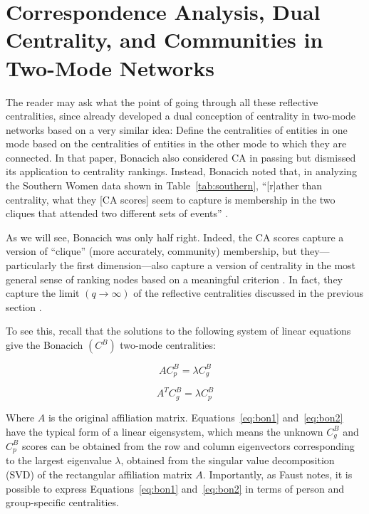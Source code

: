 \documentclass[a4paper,fleqn]{cas-sc}
\begin{document}
\section{Correspondence Analysis, Dual Centrality, and Communities in Two-Mode Networks} \label{sec:ca}
The reader may ask what the point of going through all these reflective centralities, since \citet{bonacich1991simultaneous} already developed a dual conception of centrality in two-mode networks based on a very similar idea: Define the centralities of entities in one mode based on the centralities of entities in the other mode to which they are connected. In that paper, Bonacich also considered CA in passing but dismissed its application to centrality rankings. Instead, Bonacich noted that, in analyzing the Southern Women data shown in Table~\ref{tab:southern}, ``[r]ather than centrality, what they [CA scores] seem to capture is membership in the two cliques that attended two different sets of events'' \citeyearpar[164]{bonacich1991simultaneous}. 

As we will see, Bonacich was only half right. Indeed, the CA scores capture a version of ``clique'' (more accurately, community) membership, but they---particularly the first dimension---also capture a version of centrality in the most general sense of ranking nodes based on a meaningful criterion \citep{borgatti2006graph}. In fact, they capture the limit $(q \rightarrow \infty)$ of the reflective centralities discussed in the previous section \citep{mealy2019interpreting}. 

To see this, recall that the solutions to the following system of linear equations give the Bonacich $(C^B)$ two-mode centralities:

\begin{equation}
    AC^B_p = \lambda C^B_g 
    \label{eq:bon1}
\end{equation}

\begin{equation}
    A^TC^B_g = \lambda C^B_p 
    \label{eq:bon2}
\end{equation}

Where $A$ is the original affiliation matrix. Equations~\ref{eq:bon1} and~\ref{eq:bon2} have the typical form of a linear eigensystem, which means the unknown $C^B_g$ and $C^B_p$ scores can be obtained from the row and column eigenvectors corresponding to the largest eigenvalue $\lambda$, obtained from the singular value decomposition (SVD) of the rectangular affiliation matrix $A$. Importantly, as Faust \citeyearpar[170]{faust1997centrality} notes, it is possible to express Equations~\ref{eq:bon1} and~\ref{eq:bon2} in terms of person and group-specific centralities. 
\end{document}
